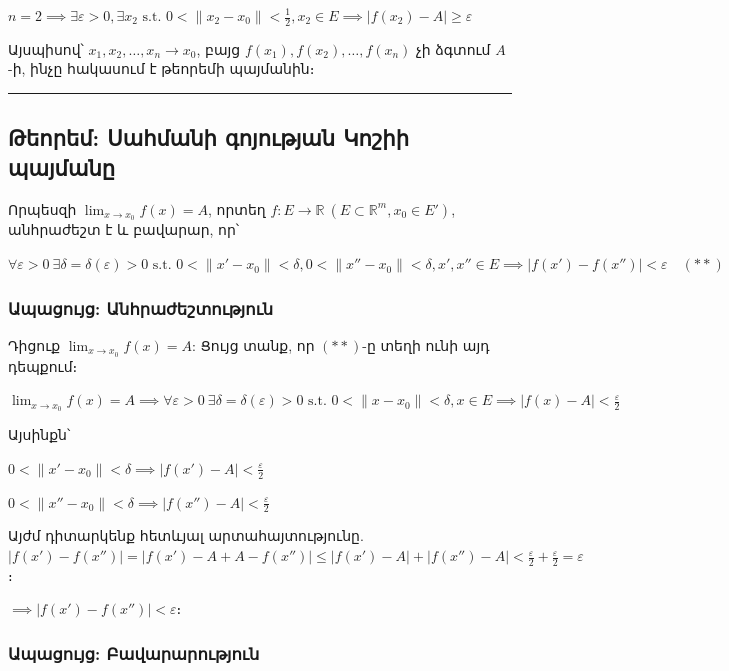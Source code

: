 \documentclass[12pt, a4paper]{article}
\begin{document}
$n = 2 \implies \exists \varepsilon > 0, \exists x_2 \text{ s.t. } 0 < \|x_2 - x_0\| < \frac{1}{2}, x_2 \in E \implies |f(x_2) - A| \ge \varepsilon$

Այսպիսով՝ $x_1, x_2, \dots, x_n \to x_0$, բայց $f(x_1), f(x_2), \dots, f(x_n)$ չի ձգտում $A$-ի, ինչը հակասում է թեորեմի պայմանին։

\vspace{1em}
\hrule
\vspace{1em}

\subsection{Թեորեմ: Սահմանի գոյության Կոշիի պայմանը}

Որպեսզի $\lim_{x \to x_0} f(x) = A$, որտեղ $f: E \to \mathbb{R} \ (E \subset \mathbb{R}^m, x_0 \in E')$, անհրաժեշտ է և բավարար, որ՝

$\forall \varepsilon > 0 \ \exists \delta = \delta(\varepsilon) > 0 \text{ s.t. } 0 < \|x' - x_0\| < \delta, 0 < \|x'' - x_0\| < \delta, x', x'' \in E \implies |f(x') - f(x'')| < \varepsilon \quad (**)$

\subsubsection{Ապացույց: Անհրաժեշտություն}

Դիցուք $\lim_{x \to x_0} f(x) = A$: Ցույց տանք, որ $(**)$-ը տեղի ունի այդ դեպքում։

$\lim_{x \to x_0} f(x) = A \implies \forall \varepsilon > 0 \ \exists \delta = \delta(\varepsilon) > 0 \text{ s.t. } 0 < \|x - x_0\| < \delta, x \in E \implies |f(x) - A| < \frac{\varepsilon}{2}$

Այսինքն՝

$0 < \|x' - x_0\| < \delta \implies |f(x') - A| < \frac{\varepsilon}{2}$

$0 < \|x'' - x_0\| < \delta \implies |f(x'') - A| < \frac{\varepsilon}{2}$

Այժմ դիտարկենք հետևյալ արտահայտությունը. $|f(x') - f(x'')| = |f(x') - A + A - f(x'')| \le |f(x') - A| + |f(x'') - A| < \frac{\varepsilon}{2} + \frac{\varepsilon}{2} = \varepsilon$։

$\implies |f(x') - f(x'')| < \varepsilon$։

\subsubsection{Ապացույց: Բավարարություն}
\end{document}
